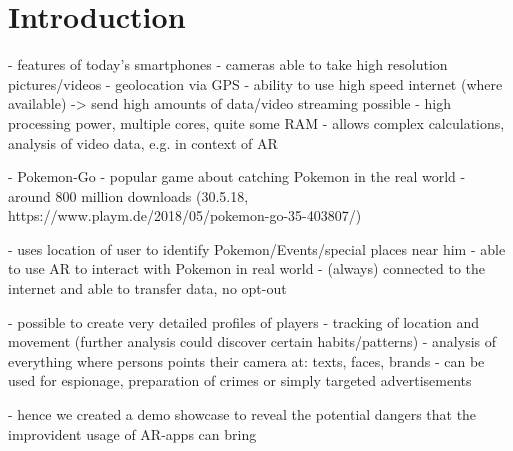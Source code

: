 \section{Introduction}
- features of today's smartphones 
 - cameras able to take high resolution pictures/videos
 - geolocation via GPS
 - ability to use high speed internet (where available) -> send high amounts of data/video streaming possible
 - high processing power, multiple cores, quite some RAM
 - allows complex calculations, analysis of video data, e.g. in context of AR

- Pokemon-Go
- popular game about catching Pokemon in the real world
- around 800 million downloads (30.5.18, https://www.playm.de/2018/05/pokemon-go-35-403807/)

- uses location of user to identify Pokemon/Events/special places near him
- able to use AR to interact with Pokemon in real world 
- (always) connected to the internet and able to transfer data, no opt-out

- possible to create very detailed profiles of players
- tracking of location and movement (further analysis could discover certain habits/patterns)
- analysis of everything where persons points their camera at: texts, faces, brands
- can be used for espionage, preparation of crimes or simply targeted advertisements

- hence we created a demo showcase to reveal the potential dangers that the improvident usage of AR-apps can bring
